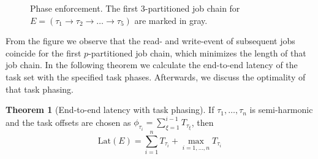 \documentclass[10pt,conference]{resources/IEEEtran}
\theoremstyle{definition}
\theoremstyle{remark}
\newcommand{\lat}{\mathrm{Lat}}
\theoremstyle{definition}
\newtheorem{theorem}{Theorem}
\begin{document}
\begin{figure}
			\caption{Phase enforcement. The first $3$-partitioned job chain for $E=(\tau_1 \to \tau_2 \to \dots \to \tau_5)$ are marked in gray.}
			\label{fig:phasing}
	\end{figure}
	From the figure we observe that the read- and write-event of subsequent jobs coincide for the first $p$-partitioned job chain, which minimizes the length of that job chain.
	In the following theorem we calculate the end-to-end latency of the task set with the specified task phases. 
	Afterwards, we discuss the optimality of that task phasing.

	\begin{theorem}[End-to-end latency with task phasing]\label{thm:key}
		If ${\tau_1, \dots, \tau_n}$ is semi-harmonic and the task offsets are chosen as $\phi_{\tau_i} = \sum_{\xi=1}^{i-1} T_{\tau_\xi}$, then 
		\begin{equation}
			\lat(E) = \sum_{i=1}^{n} T_{\tau_i} + \max_{i=1, \dots, n} T_{\tau_i}
		\end{equation}
	\end{theorem}
\end{document}
